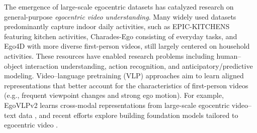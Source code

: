 \documentclass[letterpaper, 10pt, journal]{IEEEtran}  %
\begin{document}
The emergence of large-scale egocentric datasets has catalyzed research on general-purpose \emph{egocentric video understanding}. Many widely used datasets predominantly capture indoor daily activities, such as EPIC-KITCHENS \cite{damen_scaling_2018} featuring kitchen activities, Charades-Ego \cite{sigurdsson2018actor} consisting of everyday tasks, and Ego4D \cite{grauman_ego4d_2022} with more diverse first-person videos, still largely centered on household activities. These resources have enabled research problems including human--object interaction understanding, action recognition, and anticipatory/predictive modeling.
Video--language pretraining (VLP) approaches aim to learn aligned representations that better account for the characteristics of first-person videos (e.g., frequent viewpoint changes and strong ego motion). For example, EgoVLPv2 learns cross-modal representations from large-scale egocentric video--text data \cite{pramanick_egovlpv2_2023}, and recent efforts explore building foundation models tailored to egocentric video \cite{pei2024egovideo}. 

\end{document}
